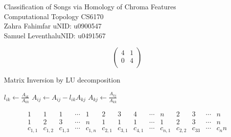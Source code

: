\documentclass[11pt, a4paper]{article}
\begin{document}
\begin{center}
    {\Large Classification of Songs via Homology of Chroma Features}\\
   Computational Topology \hfill CS6170\\
  Zahra Fahimfar \hfill uNID: u0900547\\
  Samuel Leventhal\hfill  uNID: u0491567
\end{center}
\iffalse
%
%
\begin{figure}[H]
\label{fig:prob1fig}
\end{figure}

%
%
\[ \begin{pmatrix}
  4 & 1 \\
  0 & 4 \\
\end{pmatrix}\]

%
%
  \begin{algorithm}[H]
\caption{Matrix Inversion by LU decomposition}
\begin{algorithmic}
              \State $l_{ik} \leftarrow \frac{A_{ik}}{A_{kk}}$ 
                        \State $A_{ij} \leftarrow A_{ij} - l_{ik}A_{kj}$ 
                    \EndFor
                    \EndIf
                    \State $A_{kj} \leftarrow \frac{A_{kj}}{A_{kk}}$ 
                    \EndFor
      \EndFor
  \EndFor
\end{algorithmic}
\end{algorithm}

%
%
  \[
  \begin{smallmatrix}
    1 & 1 & 1 & \cdots & 1 & 2 & 3 & 4 & \cdots & n & 2 & 3 & \cdots &n\\
    1 & 2 & 3 & \cdots & n & 1 & 1 & 1 & \cdots & 1 & 2 & 3 & \cdots & n\\
    c_{1,1} & c_{1,2} & c_{1,3} & \cdots & c_{1,n} & c_{2,1} & c_{3,1} & c_{4,1} & \cdots & c_{n,1} & c_{2,2} & c_33 &\cdots &c_nn\\
  \end{smallmatrix}
\]
\end{document}
